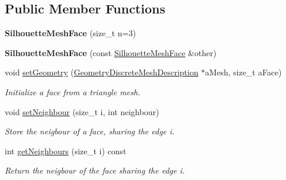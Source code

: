 \subsection*{Public Member Functions}
\begin{DoxyCompactItemize}
\item 
\mbox{\label{classvisilib_1_1_silhouette_mesh_face_a3964d6c8e62c17c8372fa69e9084889f}} 
{\bfseries Silhouette\+Mesh\+Face} (size\+\_\+t n=3)
\item 
\mbox{\label{classvisilib_1_1_silhouette_mesh_face_a7dc0c8bc6b150ecca7307eb3f0c85bcd}} 
{\bfseries Silhouette\+Mesh\+Face} (const \mbox{\hyperlink{classvisilib_1_1_silhouette_mesh_face}{Silhouette\+Mesh\+Face}} \&other)
\item 
\mbox{\label{classvisilib_1_1_silhouette_mesh_face_a4fd7d7ee6b556712f7771aecf9685ae1}} 
void \mbox{\hyperlink{classvisilib_1_1_silhouette_mesh_face_a4fd7d7ee6b556712f7771aecf9685ae1}{set\+Geometry}} (\mbox{\hyperlink{structvisilib_1_1_geometry_discrete_mesh_description}{Geometry\+Discrete\+Mesh\+Description}} $\ast$a\+Mesh, size\+\_\+t a\+Face)
\begin{DoxyCompactList}\small\item\em Initialize a face from a triangle mesh. \end{DoxyCompactList}\item 
\mbox{\label{classvisilib_1_1_silhouette_mesh_face_a481d2d1b6544e3be14c55842ee37ab0a}} 
void \mbox{\hyperlink{classvisilib_1_1_silhouette_mesh_face_a481d2d1b6544e3be14c55842ee37ab0a}{set\+Neighbour}} (size\+\_\+t i, int neighbour)
\begin{DoxyCompactList}\small\item\em Store the neigbour of a face, sharing the edge i. \end{DoxyCompactList}\item 
\mbox{\label{classvisilib_1_1_silhouette_mesh_face_aaaab9df89dcf72e9a039b1556762f0c3}} 
int \mbox{\hyperlink{classvisilib_1_1_silhouette_mesh_face_aaaab9df89dcf72e9a039b1556762f0c3}{get\+Neighbours}} (size\+\_\+t i) const
\begin{DoxyCompactList}\small\item\em Return the neigbour of the face sharing the edge i. \end{DoxyCompactList}\item 

\end{DoxyCompactItemize}
